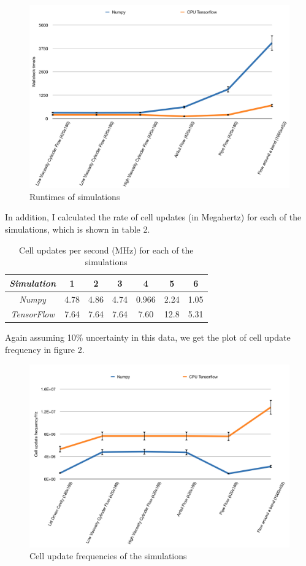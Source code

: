 \documentclass{article}
\begin{document}
\begin{figure}[H] 
	\centering
	\label{graph}
	\includegraphics[width=5in]{Diagrams/TimeGraph.png}
	\caption{Runtimes of simulations}
\end{figure}

In addition, I calculated the rate of cell updates (in Megahertz) for each of the simulations, which is shown in table 2.

\begin{table}[H]
\caption{Cell updates per second (MHz) for each of the simulations}
\begin{center}
\begin{tabular}{c||c|c|c|c|c|c}
\emph{Simulation} & 1 & 2 & 3 & 4 & 5 & 6\\
\hline
\hline
\emph{Numpy} & 4.78 & 4.86 & 4.74 & 0.966 & 2.24 & 1.05 \\
\hline
\emph{TensorFlow} & 7.64 & 7.64 & 7.64 & 7.60 & 12.8 & 5.31 \\
\hline
\end{tabular}
\end{center}
\end{table}

Again assuming 10\% uncertainty in this data, we get the plot of cell update frequency in figure 2.

\begin{figure}[H] 
	\centering
	\label{graph}
	\includegraphics[width=5in]{Diagrams/FreqGraph.png}
	\caption{Cell update frequencies of the simulations}
\end{figure}
\end{document}
